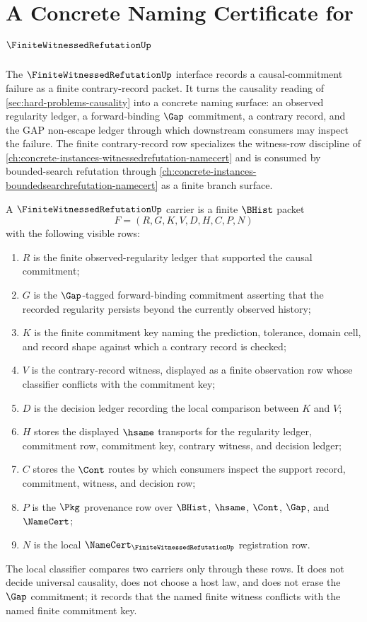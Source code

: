 \chapter{A Concrete Naming Certificate for $\FiniteWitnessedRefutationUp$}
\label{ch:concrete-instances-finitewitnessedrefutation-namecert}

The $\FiniteWitnessedRefutationUp$ interface records a causal-commitment failure as a finite contrary-record packet. It turns the causality reading of \autoref{sec:hard-problems-causality} into a concrete naming surface: an observed regularity ledger, a forward-binding $\Gap$ commitment, a contrary record, and the GAP non-escape ledger through which downstream consumers may inspect the failure. The finite contrary-record row specializes the witness-row discipline of \autoref{ch:concrete-instances-witnessedrefutation-namecert} and is consumed by bounded-search refutation through \autoref{ch:concrete-instances-boundedsearchrefutation-namecert} as a finite branch surface.

\begin{definition}
\label{def:finite-witnessed-refutation-carrier}
A $\FiniteWitnessedRefutationUp$ carrier is a finite $\BHist$ packet
$$
F=(R,G,K,V,D,H,C,P,N)
$$
with the following visible rows:
\begin{enumerate}
\item $R$ is the finite observed-regularity ledger that supported the causal commitment;
\item $G$ is the $\Gap$-tagged forward-binding commitment asserting that the recorded regularity persists beyond the currently observed history;
\item $K$ is the finite commitment key naming the prediction, tolerance, domain cell, and record shape against which a contrary record is checked;
\item $V$ is the contrary-record witness, displayed as a finite observation row whose classifier conflicts with the commitment key;
\item $D$ is the decision ledger recording the local comparison between $K$ and $V$;
\item $H$ stores the displayed $\hsame$ transports for the regularity ledger, commitment row, commitment key, contrary witness, and decision ledger;
\item $C$ stores the $\Cont$ routes by which consumers inspect the support record, commitment, witness, and decision row;
\item $P$ is the $\Pkg$ provenance row over $\BHist$, $\hsame$, $\Cont$, $\Gap$, and $\NameCert$;
\item $N$ is the local $\NameCert_{\FiniteWitnessedRefutationUp}$ registration row.
\end{enumerate}
The local classifier compares two carriers only through these rows. It does not decide universal causality, does not choose a host law, and does not erase the $\Gap$ commitment; it records that the named finite witness conflicts with the named finite commitment key.
\end{definition}


